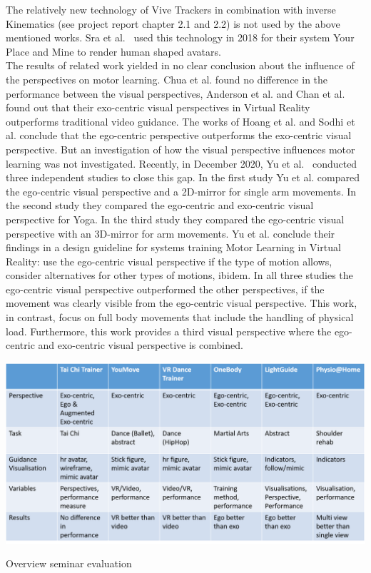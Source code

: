 The relatively new technology of Vive Trackers in combination with inverse Kinematics (see project report chapter 2.1 and 2.2) is not used by the above mentioned works. Sra et al.~\cite{samesetup} used this technology in 2018 for their system Your Place and Mine to render human shaped avatars.\\
The results of related work yielded in no clear conclusion about the influence of the perspectives on motor learning. Chua et al. found no difference in the performance between the visual perspectives, Anderson et al. and Chan et al. found out that their exo-centric visual perspectives in Virtual Reality outperforms traditional video guidance. The works of Hoang et al. and Sodhi et al. conclude that the ego-centric perspective outperforms the exo-centric visual perspective. But an investigation of how the visual perspective influences motor learning was not investigated. Recently, in December 2020, Yu et al.~\cite{perspectivematters} conducted three independent studies to close this gap. In the first study Yu et al. compared the ego-centric visual perspective and a 2D-mirror for single arm movements. In the second study they compared the ego-centric and exo-centric visual perspective for Yoga. In the third study they compared the ego-centric visual perspective with an 3D-mirror for arm movements. Yu et al. conclude their findings in a design guideline for systems training Motor Learning in Virtual Reality: use the ego-centric visual perspective if the type of motion allows, consider alternatives for other types of motions, ibidem. In all three studies the ego-centric visual perspective outperformed the other perspectives, if the movement was clearly visible from the ego-centric visual perspective. This work, in contrast, focus on full body movements that include the handling of physical load. Furthermore, this work provides a third visual perspective where the ego-centric and exo-centric visual perspective is combined.
\begin{table}[htb]
	\centering
	\includegraphics[width=\textwidth]{figures/detail_paper_overview.png}
	\caption[Overview seminar evaluation]{Overview seminar evaluation}
	\label{tab:rw_overview_detail}
\end{table}


